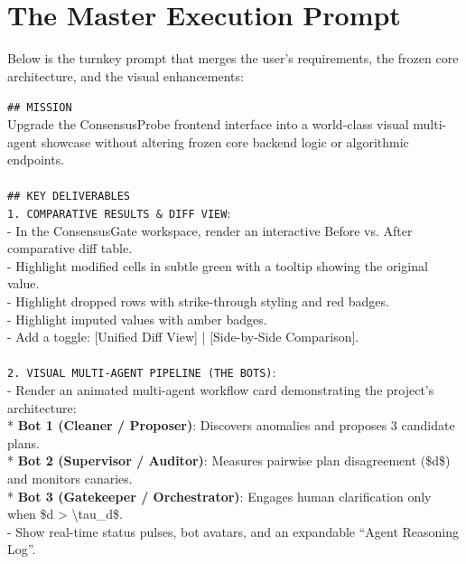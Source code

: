 \documentclass[11pt,a4paper]{article}
\begin{document}
\section{The Master Execution Prompt}
\label{sec:prompt}

Below is the turnkey prompt that merges the user's requirements, the frozen core architecture, and the visual enhancements:

\begin{tcolorbox}[colback=codebg,colframe=primaryblue,title=\textbf{MASTER IMPLEMENTATION PROMPT: ConsensusProbe 2.0 Showcase Upgrade}]
\small
\texttt{\#\# MISSION}\\
Upgrade the ConsensusProbe frontend interface into a world-class visual multi-agent showcase without altering frozen core backend logic or algorithmic endpoints.\\
\\
\texttt{\#\# KEY DELIVERABLES}\\
\texttt{1. COMPARATIVE RESULTS \& DIFF VIEW}:\\
- In the ConsensusGate workspace, render an interactive Before vs. After comparative diff table.\\
- Highlight modified cells in subtle green with a tooltip showing the original value.\\
- Highlight dropped rows with strike-through styling and red badges.\\
- Highlight imputed values with amber badges.\\
- Add a toggle: [Unified Diff View] | [Side-by-Side Comparison].\\
\\
\texttt{2. VISUAL MULTI-AGENT PIPELINE (THE BOTS)}:\\
- Render an animated multi-agent workflow card demonstrating the project's architecture:\\
  * \textbf{Bot 1 (Cleaner / Proposer)}: Discovers anomalies and proposes 3 candidate plans.\\
  * \textbf{Bot 2 (Supervisor / Auditor)}: Measures pairwise plan disagreement (\$d\$) and monitors canaries.\\
  * \textbf{Bot 3 (Gatekeeper / Orchestrator)}: Engages human clarification only when \$d > \textbackslash tau\_d\$.\\
- Show real-time status pulses, bot avatars, and an expandable ``Agent Reasoning Log''.\\
\\

\end{tcolorbox}
\end{document}
